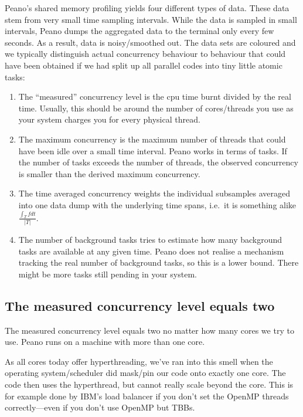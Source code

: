 \noindent
Peano's shared memory profiling yields four different types of data.
These data stem from very small time sampling intervals. While the data is
sampled in small intervals, Peano dumps the aggregated data to the terminal only
every few seconds. As a result, data is noisy/smoothed out.
The data sets are coloured and we typically distinguish actual concurrency
behaviour to behaviour that could have been obtained if we had split up all
parallel codes into tiny little atomic tasks:

\begin{enumerate}
  \item The ``measured'' concurrency level is the cpu time burnt divided by the
  real time. Usually, this should be around the number of cores/threads you use
  as your system charges you for every physical thread.
  \item The maximum concurrency is the maximum number of threads that could have
  been idle over a small time interval. Peano works in terms of tasks. If the
  number of tasks exceeds the number of threads, the observed concurrency is
  smaller than the derived maximum concurrency. 
  \item The time averaged concurrency weights the individual subsamples averaged
  into one data dump with the underlying time spans, i.e.~it is something alike
  $\frac{\int _T f dt }{|T|}$.
  \item The number of background tasks tries to estimate how many background
  tasks are available at any given time. Peano does not realise a mechanism
  tracking the real number of background tasks, so this is a lower bound. There
  might be more tasks still pending in your system.
\end{enumerate}


\subsection{The measured concurrency level equals two}

\begin{smell}
 The measured concurrency level equals two no matter how many cores we try to
 use. Peano runs on a machine with more than one core.
\end{smell}

\noindent
As all cores today offer hyperthreading, we've ran into this smell when the
operating system/scheduler did mask/pin our code onto exactly one core. 
The code then uses the hyperthread, but cannot really scale beyond the core.
This is for example done by IBM's load balancer if you don't set the OpenMP
threads correctly---even if you don't use OpenMP but TBBs.

